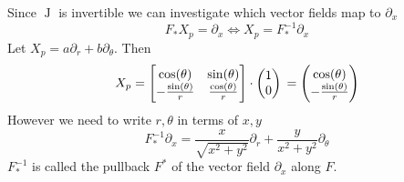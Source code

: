 \begin{example}
    Since \(\operatorname{J}\) is invertible we can investigate which vector fields map to \(\partial_x\)
    \begin{equation}
        F_* X_p = \partial_x  \iff X_p = F_{*}^{-1} \partial_x
    \end{equation}
    Let \(X_p = a \partial_r + b \partial_\theta\).
    Then
    \begin{equation}
        X_p
        =
        \begin{bmatrix}
            \cos (\theta)            & \sin (\theta)           \\
            -\frac{\sin (\theta)}{r} & \frac{\cos (\theta)}{r} \\
        \end{bmatrix}
        \cdot
        \begin{pmatrix}
            1 \\ 0
        \end{pmatrix} \\
        =
        \begin{pmatrix}
            \cos(\theta) \\ -\frac{\sin (\theta)}{r}
        \end{pmatrix}
    \end{equation}
    However we need to write \(r, \theta\) in terms of \(x, y\)
    \begin{equation}
        F_{*}^{-1} \partial_x = \frac{x}{\sqrt{x^2+y^2}}\partial_r + \frac{y}{x^2 + y^2} \partial_\theta
    \end{equation}
    \(F_{*}^{-1}\) is called the pullback \(F^*\) of the vector field \(\partial_x\) along \(F\).
\end{example}

